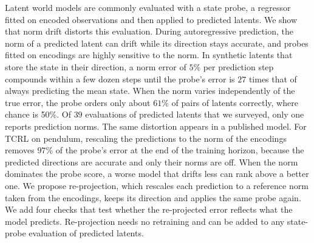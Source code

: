 Latent world models are commonly evaluated with a state probe, a regressor fitted on encoded observations and then applied to predicted latents. We show that norm drift distorts this evaluation. During autoregressive prediction, the norm of a predicted latent can drift while its direction stays accurate, and probes fitted on encodings are highly sensitive to the norm. In synthetic latents that store the state in their direction, a norm error of $5$\% per prediction step compounds within a few dozen steps until the probe's error is $27$ times that of always predicting the mean state. When the norm varies independently of the true error, the probe orders only about $61$\% of pairs of latents correctly, where chance is 50\%. Of $39$ evaluations of predicted latents that we surveyed, only one reports prediction norms. The same distortion appears in a published model. For TCRL on pendulum, rescaling the predictions to the norm of the encodings removes $97$\% of the probe's error at the end of the training horizon, because the predicted directions are accurate and only their norms are off. When the norm dominates the probe score, a worse model that drifts less can rank above a better one. We propose re-projection, which rescales each prediction to a reference norm taken from the encodings, keeps its direction and applies the same probe again. We add four checks that test whether the re-projected error reflects what the model predicts. Re-projection needs no retraining and can be added to any state-probe evaluation of predicted latents.
